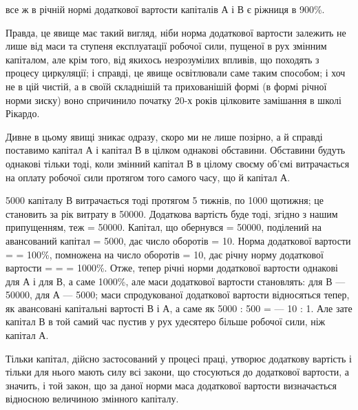 \parcont{}  %
все ж в річній нормі додаткової вартости капіталів А і В є ріжниця в
900\%.

Правда, це явище має такий вигляд, ніби норма додаткової вартости
залежить не лише від маси та ступеня експлуатації робочої сили,
пущеної в рух змінним капіталом, але крім того, від якихось незрозумілих
впливів, що походять з процесу циркуляції; і справді, це явище
освітлювали саме таким способом; і хоч не в цій чистій, а в своїй складнішій
та прихованішій формі (в формі річної норми зиску) воно спричинило
початку 20-х років цілковите замішання в школі Рікардо.

Дивне в цьому явищі зникає одразу, скоро ми не лише позірно, а
й справді поставимо капітал А і капітал В в цілком однакові обставини.
Обставини будуть однакові тільки тоді, коли змінний капітал В в цілому
своєму об’ємі витрачається на оплату робочої сили протягом того
самого часу, що й капітал А.

5000 капіталу В витрачається тоді протягом 5 тижнів, по
1000 щотижня; це становить за рік витрату в 50000.
Додаткова вартість буде тоді, згідно з нашим припущенням, теж = 50000. Капітал, що обернувся = 50000, поділений на авансований
капітал = 5000, дає число оборотів = 10. Норма додаткової
вартости =  = 100\%, помножена на число оборотів = 10, дає річну норму додаткової
вартости =  =  = 1000\%. Отже, тепер річні норми додаткової вартости однакові для
А і для В, а саме
1000\%, але маси додаткової вартости становлять: для В — 50000,
для А — 5000; маси спродукованої додаткової вартости відносяться
тепер, як авансовані капітальні вартості В і А, а саме як 5000 : 500 =
— 10 : 1. Але зате капітал В в той самий час пустив у рух удесятеро
більше робочої сили, ніж капітал А.

Тільки капітал, дійсно застосований у процесі праці, утворює додаткову
вартість і тільки для нього мають силу всі закони, що стосуються
до додаткової вартости, а значить, і той закон, що за даної норми маса
додаткової вартости визначається відносною величиною змінного капіталу.

